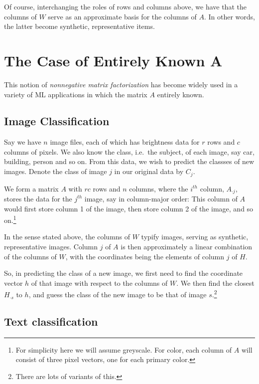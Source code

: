 Of course, interchanging the roles of rows and columns above, we have
that the columns of $W$ serve as an approximate basis for the columns of
$A$.  In other words, the latter become synthetic, representative items.

\section{The Case of Entirely Known A}

This notion of {\it nonnegative matrix factorization} has become widely
used in a variety of ML applications in which the matrix $A$ entirely
known. 

\subsection{Image Classification}

Say we have $n$ image files, each of which has brightness data for $r$
rows and $c$ columns of pixels.  We also know the class, i.e.\ the
subject, of each image, say car, building, person and so on.  From this
data, we wish to predict the classses of new images. Denote the class of
image $j$ in our original data by $C_j$.

We form a matrix $A$ with $rc$ rows and $n$ columns, where the $i^{th}$
column, $A_{\cdot j}$, stores the data for the $j^{th}$ image, say in
column-major order:  This column of $A$ would first store column 1 of
the image, then store column 2 of the image, and so on.\footnote{For
simplicity here we will assume greyscale.  For color, each column of $A$
will consist of three pixel vectors, one for each primary color.}

In the sense stated above, the columns of $W$ typify images, serving as
synthetic, representative images.  Column $j$ of $A$ is then
approximately a linear combination of the columns of $W$, with the
coordinates being the elements of column $j$ of $H$.

So, in predicting the class of a new image, we first need to find the
coordinate vector $h$ of that image with respect to the columns of $W$.  
We then find the closest $H_{\cdot s}$ to $h$, and guess the class of
the new image to be that of image $s$.\footnote{There are lots of
variants of this.}

\subsection{Text classification}

